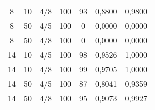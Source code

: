 \begin{table}[H]
\begin{tabular}{@{}ccccccc@{}}
8                                                     & 10                                                        & 4/8 & 100 & 93 & 0,8800        & 0,9800       \\
8                                                     & 50                                                        & 4/5 & 100 & 0  & 0,0000        & 0,0000       \\
8                                                     & 50                                                        & 4/8 & 100 & 0  & 0,0000        & 0,0000       \\
14                                                    & 10                                                        & 4/5 & 100 & 98 & 0,9526        & 1,0000       \\
14                                                    & 10                                                        & 4/8 & 100 & 99 & 0,9705        & 1,0000       \\
14                                                    & 50                                                        & 4/5 & 100 & 87 & 0,8041        & 0,9359       \\
14                                                    & 50                                                        & 4/8 & 100 & 95 & 0,9073        & 0,9927       \\ \bottomrule
\end{tabular}
\end{table}


